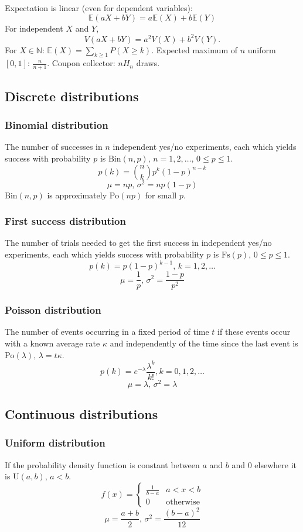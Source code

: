 Expectation is linear (even for dependent variables):
\[\mathbb{E}(aX+bY) = a\mathbb{E}(X)+b\mathbb{E}(Y)\]
For independent $X$ and $Y$, \[V(aX+bY) = a^2V(X)+b^2V(Y).\]
For $X \in \mathbb{N}$: $\mathbb{E}(X) = \sum_{k \ge 1} P(X \ge k)$.
Expected maximum of $n$ uniform $[0,1]$: $\frac{n}{n+1}$.
Coupon collector: $n H_n$ draws.

\subsection{Discrete distributions}

\subsubsection{Binomial distribution}
The number of successes in $n$ independent yes/no experiments, each which yields success with probability $p$ is $\textrm{Bin}(n,p),\,n=1,2,\dots,\, 0\leq p\leq1$.
\[p(k)=\binom{n}{k}p^k(1-p)^{n-k}\]
\[\mu = np,\,\sigma^2=np(1-p)\]
$\textrm{Bin}(n,p)$ is approximately $\textrm{Po}(np)$ for small $p$.

\subsubsection{First success distribution}
The number of trials needed to get the first success in independent yes/no experiments, each which yields success with probability $p$ is $\textrm{Fs}(p),\,0\leq p\leq1$.
\[p(k)=p(1-p)^{k-1},\,k=1,2,\dots\]
\[\mu = \frac1p,\,\sigma^2=\frac{1-p}{p^2}\]

\subsubsection{Poisson distribution}
The number of events occurring in a fixed period of time $t$ if these events occur with a known average rate $\kappa$ and independently of the time since the last event is $\textrm{Po}(\lambda),\,\lambda=t\kappa$.
\[p(k)=e^{-\lambda}\frac{\lambda^k}{k!}, k=0,1,2,\dots\]
\[\mu=\lambda,\,\sigma^2=\lambda\]

\subsection{Continuous distributions}

\subsubsection{Uniform distribution}
If the probability density function is constant between $a$ and $b$ and 0 elsewhere it is $\textrm{U}(a,b),\,a<b$.
\[f(x) = \left\{
\begin{array}{cl}
\frac{1}{b-a} & a<x<b\\
0 & \textrm{otherwise}
\end{array}\right.\]
\[\mu=\frac{a+b}{2},\,\sigma^2=\frac{(b-a)^2}{12}\]

